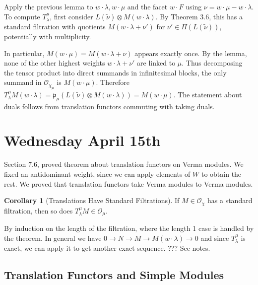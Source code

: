 \documentclass[11pt]{scrartcl}
\theoremstyle{definition}
\theoremstyle{theorem}
\newtheorem{corollary}[theorem]{Corollary}
\theoremstyle{proof}
\newenvironment{proof}
{\pushQED{$\qed$}\pf}
{\par\popQED\endpf}
\theoremstyle{definition}
\theoremstyle{break}
\theoremstyle{problem}
\newcommand{\pr}[0]{{\mathfrak{p}}}
\newcommand{\OO}[0]{{\mathcal{O}}}
\newcommand{\tensor}[0]{\otimes}
\renewcommand{\qed}[0]{\hfill\blacksquare}
\renewcommand{\to}[0]{\longrightarrow}
\begin{document}
\begin{proof}

Apply the previous lemma to \(w\cdot \lambda, w\cdot \mu\) and the facet
\(w\cdot F\) using \(\nu = w\cdot \mu - w\cdot \lambda\). To compute
\(T_\lambda^\mu\), first consider
\(L(\tilde \nu) \tensor M(w\cdot \lambda)\). By Theorem 3.6, this has a
standard filtration with quotients \(M(w\cdot \lambda + \nu')\) for
\(\nu' \in \Pi(L(\tilde \nu))\), potentially with multiplicity.

\hfill\break

In particular, \(M(w\cdot \mu) = M(w\cdot \lambda + \nu)\) appears
exactly once. By the lemma, none of the other highest weights
\(w\cdot \lambda + \nu'\) are linked to \(\mu\). Thus decomposing the
tensor product into direct summands in infinitesimal blocks, the only
summand in \(\OO_{\chi_\mu}\) is \(M(w\cdot \mu)\). Therefore
\(T_\lambda^\mu M(w\cdot \lambda) = \pr_\mu (L(\tilde \nu) \tensor M(w\cdot \lambda)) = M(w\cdot \mu)\).
The statement about duals follows from translation functors commuting
with taking duals.\end{proof}

\hypertarget{wednesday-april-15th}{%
\section{Wednesday April 15th}\label{wednesday-april-15th}}

Section 7.6, proved theorem about translation functors on Verma modules.
We fixed an antidominant weight, since we can apply elements of \(W\) to
obtain the rest. We proved that translation functors take Verma modules
to Verma modules.

\begin{corollary}[Translations Have Standard Filtrations]

If \(M\in \OO_\chi\) has a standard filtration, then so does
\(T_\lambda^\mu M \in \OO_\mu\).\end{corollary}

\begin{proof}

By induction on the length of the filtration, where the length 1 case is
handled by the theorem. In general we have
\(0 \to N \to M \to M(w\cdot \lambda) \to 0\) and since
\(T_\lambda^\mu\) is exact, we can apply it to get another exact
sequence. ??? See notes.\end{proof}

\hypertarget{translation-functors-and-simple-modules}{%
\subsection{Translation Functors and Simple
Modules}\label{translation-functors-and-simple-modules}}
\end{document}
